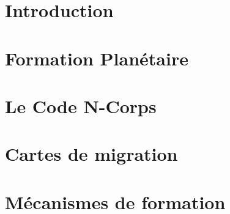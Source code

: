 \documentclass[logos,chaptertoc]{bordeaux-thesis}
\begin{document}

\newpage


\strut\newpage

\tableofcontents

\listoffigures
\mtcaddchapter %

\listoftables
\mtcaddchapter %

\newpage


\pagestyle{fancy}

\chapter*{Introduction}



\chapter{Formation Planétaire}\label{sec:chap1}


\chapter{Le Code N-Corps}\label{sec:code_n-corps}\label{sec:chap2}



\chapter{Cartes de migration}\label{sec:chap3}



\chapter{Mécanismes de formation}\label{sec:chap4}

\end{document}
